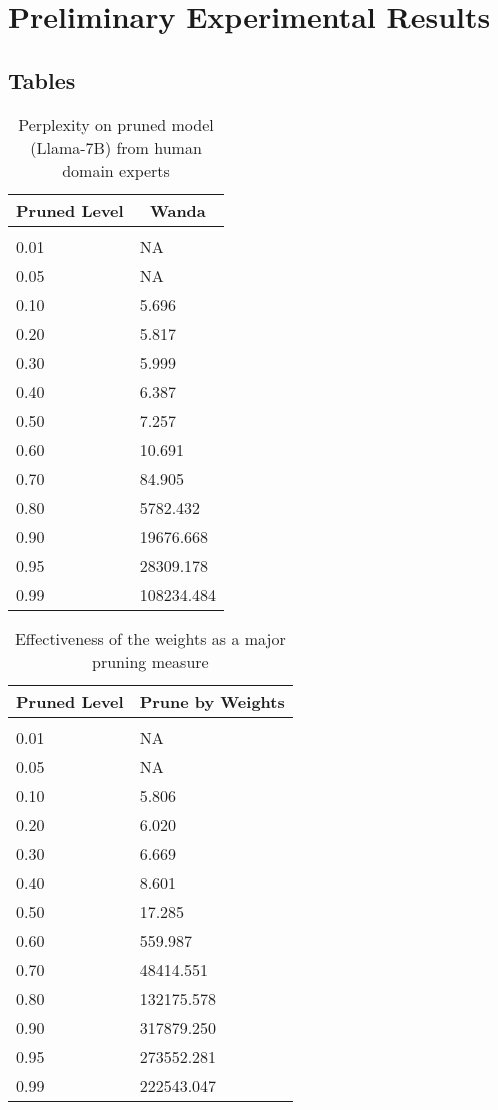 \documentclass{article} %
\begin{document}
\section{Preliminary Experimental Results}
\label{res}

\subsection{Tables}

\begin{table}[t]
\caption{Perplexity on pruned model (Llama-7B) from human domain experts}
\label{table-1}
\begin{center}
\begin{tabular}{ll}
\multicolumn{1}{c}{\bf Pruned Level}  &\multicolumn{1}{c}{\bf Wanda}
\\ \hline \\
0.01         &NA \\
0.05         &NA \\
0.10         &5.696 \\
0.20         &5.817 \\
0.30         &5.999 \\
0.40         &6.387 \\
0.50         &7.257 \\
0.60         &10.691 \\
0.70         &84.905 \\
0.80         &5782.432 \\
0.90         &19676.668 \\
0.95         &28309.178 \\
0.99         &108234.484 \\
\end{tabular}
\end{center}
\end{table}

\begin{table}[t]
\caption{Effectiveness of the weights as a major pruning measure}
\label{table-2}
\begin{center}
\begin{tabular}{ll}
\multicolumn{1}{c}{\bf Pruned Level}  &\multicolumn{1}{c}{\bf Prune by Weights}
\\ \hline \\
0.01         &NA \\
0.05         &NA \\
0.10         &5.806 \\
0.20         &6.020 \\
0.30         &6.669 \\
0.40         &8.601 \\
0.50         &17.285 \\
0.60         &559.987 \\
0.70         &48414.551 \\
0.80         &132175.578 \\
0.90         &317879.250 \\
0.95         &273552.281 \\
0.99         &222543.047 \\
\end{tabular}
\end{center}
\end{table}
\end{document}
